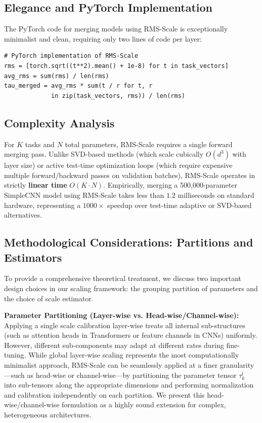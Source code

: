 \subsection{Elegance and PyTorch Implementation}
The PyTorch code for merging models using RMS-Scale is exceptionally minimalist and clean, requiring only two lines of code per layer:
\begin{verbatim}
# PyTorch implementation of RMS-Scale
rms = [torch.sqrt((t**2).mean() + 1e-8) for t in task_vectors]
avg_rms = sum(rms) / len(rms)
tau_merged = avg_rms * sum(t / r for t, r 
             in zip(task_vectors, rms)) / len(rms)
\end{verbatim}

\subsection{Complexity Analysis}
For $K$ tasks and $N$ total parameters, RMS-Scale requires a single forward merging pass. Unlike SVD-based methods (which scale cubically $O(d^3)$ with layer size) or active test-time optimization loops (which require expensive multiple forward/backward passes on validation batches), RMS-Scale operates in strictly \textbf{linear time} $O(K \cdot N)$. Empirically, merging a 500,000-parameter SimpleCNN model using RMS-Scale takes less than $1.2$ milliseconds on standard hardware, representing a $1000\times$ speedup over test-time adaptive or SVD-based alternatives.

\subsection{Methodological Considerations: Partitions and Estimators}
To provide a comprehensive theoretical treatment, we discuss two important design choices in our scaling framework: the grouping partition of parameters and the choice of scale estimator.

\textbf{Parameter Partitioning (Layer-wise vs. Head-wise/Channel-wise):} Applying a single scale calibration layer-wise treats all internal sub-structures (such as attention heads in Transformers or feature channels in CNNs) uniformly. However, different sub-components may adapt at different rates during fine-tuning. While global layer-wise scaling represents the most computationally minimalist approach, RMS-Scale can be seamlessly applied at a finer granularity—such as head-wise or channel-wise—by partitioning the parameter tensor $\tau_k^l$ into sub-tensors along the appropriate dimensions and performing normalization and calibration independently on each partition. We present this head-wise/channel-wise formulation as a highly sound extension for complex, heterogeneous architectures.

